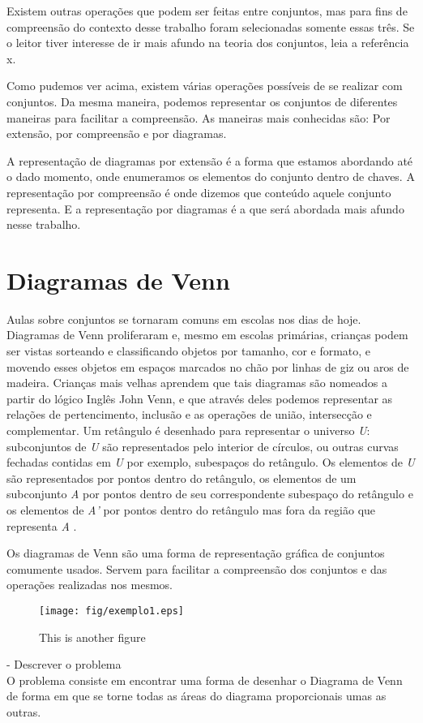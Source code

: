 Existem outras operações que podem ser feitas entre conjuntos, mas para fins de compreensão do contexto desse trabalho foram selecionadas somente essas três. Se o leitor tiver interesse de ir mais afundo na teoria dos conjuntos, leia a referência x.

Como pudemos ver acima, existem várias operações possíveis de se realizar com conjuntos. Da mesma maneira, podemos representar os conjuntos de diferentes maneiras para facilitar a compreensão. As maneiras mais conhecidas são: Por extensão, por compreensão e por diagramas. 

A representação de diagramas por extensão é a forma que estamos abordando até o dado momento, onde enumeramos os elementos do conjunto dentro de chaves. A representação por compreensão é onde dizemos que conteúdo aquele conjunto representa. E a representação por diagramas é a que será abordada mais afundo nesse trabalho.


\section{Diagramas de Venn}

Aulas sobre conjuntos se tornaram comuns em escolas nos dias de hoje. Diagramas de Venn proliferaram e, mesmo em escolas primárias, crianças podem ser vistas sorteando e classificando objetos por tamanho, cor e formato, e movendo esses objetos em espaços marcados no chão por linhas de giz ou aros de madeira. Crianças mais velhas aprendem que tais diagramas são nomeados a partir do lógico Inglês John Venn, e que através deles podemos representar as relações de pertencimento, inclusão e as operações de união, intersecção e complementar. Um retângulo é desenhado para representar o universo \textit{U}: subconjuntos de \textit{U} são representados pelo interior de círculos, ou outras curvas fechadas contidas em \textit{U} por exemplo, subespaços do retângulo. Os elementos de \textit{U} são representados por pontos dentro do retângulo, os elementos de um subconjunto \textit{A} por pontos dentro de seu correspondente subespaço do retângulo e os elementos de \textit{A'} por pontos dentro do retângulo mas fora da região que representa \textit{A}
  \cite{baron1969note}.
  
  
  

Os diagramas de Venn são uma forma de representação gráfica de conjuntos comumente usados. Servem para facilitar a compreensão dos conjuntos e das operações realizadas nos mesmos.
  

\begin{figure}[htb]
	\centering\texttt{[image: fig/exemplo1.eps]}
	\caption{\label{fig:fig2}This is another figure}
\end{figure}
- Descrever o problema \\
O problema consiste em encontrar uma forma de desenhar o Diagrama de Venn de forma em que se torne todas as áreas do diagrama proporcionais umas as outras. 

